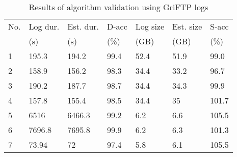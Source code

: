 \begin{table}[!ht]
\caption{Results of algorithm validation using GriFTP logs}
\begin{center}
\begin{tabular}{|l|l|l|l|l|l|l|} \hline
No. & Log dur. & Est. dur.& D-acc& Log size& Est. size & S-acc\\ 
   & (s) & (s) & (\%) & (GB) & (GB) & (\%) \\ \hline
1 & 195.3 &  194.2 &  	99.4	& 52.4		& 51.9 	&  99.0\\
2 &158.9 & 156.2 & 	98.3	 & 34.4 	& 33.2	 & 96.7      \\
3 &190.2 & 187.7 &	98.7	 & 34.4		& 34.3	 &99.9     \\
4 &157.8 & 155.4 &  98.5	& 34.4		&35	& 101.7     \\
5 &6516  &  6466.3 &   99.2 	& 6.2 & 6.6	 &105.5    \\
6 &7696.8 & 7695.8  &   99.9	&6.2 & 6.3	 &101.3    \\
7 &73.94 & 72	&   97.4	& 5.8	& 6.1	&105.5   \\
\hline
\end{tabular}
\end{center}
\label{tab:sessions}
\end{table}











